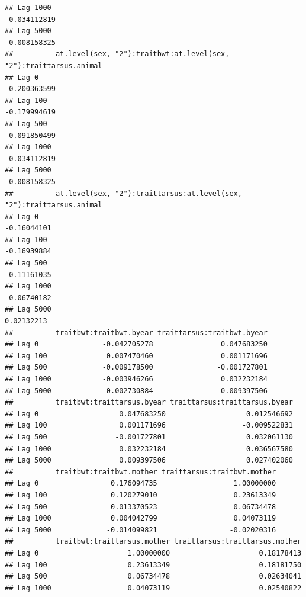 \documentclass[
  12pt,
]{book}
\begin{document}
\begin{verbatim}
## Lag 1000                                                      -0.034112819
## Lag 5000                                                      -0.008158325
##          at.level(sex, "2"):traitbwt:at.level(sex, "2"):traittarsus.animal
## Lag 0                                                         -0.200363599
## Lag 100                                                       -0.179994619
## Lag 500                                                       -0.091850499
## Lag 1000                                                      -0.034112819
## Lag 5000                                                      -0.008158325
##          at.level(sex, "2"):traittarsus:at.level(sex, "2"):traittarsus.animal
## Lag 0                                                             -0.16044101
## Lag 100                                                           -0.16939884
## Lag 500                                                           -0.11161035
## Lag 1000                                                          -0.06740182
## Lag 5000                                                           0.02132213
##          traitbwt:traitbwt.byear traittarsus:traitbwt.byear
## Lag 0               -0.042705278                0.047683250
## Lag 100              0.007470460                0.001171696
## Lag 500             -0.009178500               -0.001727801
## Lag 1000            -0.003946266                0.032232184
## Lag 5000             0.002730884                0.009397506
##          traitbwt:traittarsus.byear traittarsus:traittarsus.byear
## Lag 0                   0.047683250                   0.012546692
## Lag 100                 0.001171696                  -0.009522831
## Lag 500                -0.001727801                   0.032061130
## Lag 1000                0.032232184                   0.036567580
## Lag 5000                0.009397506                   0.027402060
##          traitbwt:traitbwt.mother traittarsus:traitbwt.mother
## Lag 0                 0.176094735                  1.00000000
## Lag 100               0.120279010                  0.23613349
## Lag 500               0.013370523                  0.06734478
## Lag 1000              0.004042799                  0.04073119
## Lag 5000             -0.014099821                 -0.02020316
##          traitbwt:traittarsus.mother traittarsus:traittarsus.mother
## Lag 0                     1.00000000                     0.18178413
## Lag 100                   0.23613349                     0.18181750
## Lag 500                   0.06734478                     0.02634041
## Lag 1000                  0.04073119                     0.02540822

\end{verbatim}
\end{document}
